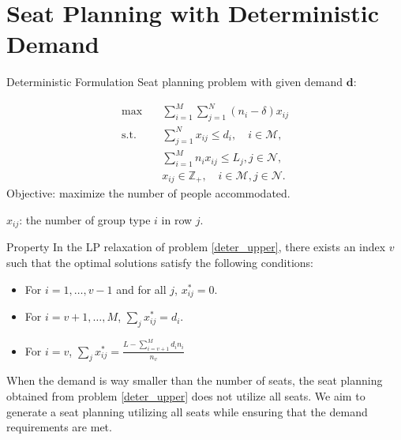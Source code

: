 
\section{Seat Planning with Deterministic Demand}
    \frame{\sectionpage}

  \begin{frame}{Deterministic Formulation}  %
    Seat planning problem with given demand $\bm{d}$:

    \begin{equation}\label{deter_upper}
      \begin{aligned}
      \max \quad & \sum_{i=1}^{M}  \sum_{j= 1}^{N} (n_i- \delta) x_{ij} \\
      \text {s.t.} \quad & \sum_{j= 1}^{N} x_{ij} \leq d_{i}, \quad i \in \mathcal{M}, \\
      & \sum_{i=1}^{M} n_{i} x_{ij} \leq L_j, j \in \mathcal{N}, \\
      & x_{ij} \in \mathbb{Z}_{+}, \quad i \in \mathcal{M}, j \in \mathcal{N}.
      \end{aligned}
    \end{equation}
    Objective: maximize the number of people accommodated.

    $x_{ij}$: the number of group type $i$ in row $j$.
  \end{frame}

  \begin{frame}{Property}
    In the LP relaxation of problem \eqref{deter_upper}, there exists an index $v$ such that the optimal solutions satisfy the following conditions:

    \begin{itemize}
      \item For $i = 1,\ldots, v-1$ and for all $j$, $x_{ij}^{*} = 0$. 
      \item For $i = v+1,\ldots, M$, $\sum_{j} x_{ij}^{*} = d_{i}$. 

      \item For $i = v$, $\sum_{j} x_{ij}^{*} = \frac{L - \sum_{i = v+1}^{M} {d_i n_i}}{n_v}$ 
    \end{itemize}

    When the demand is way smaller than the number of seats, the seat planning obtained from problem \eqref{deter_upper} does not utilize all seats. We aim to generate a seat planning utilizing all seats while ensuring that the demand requirements are met.
  \end{frame}

